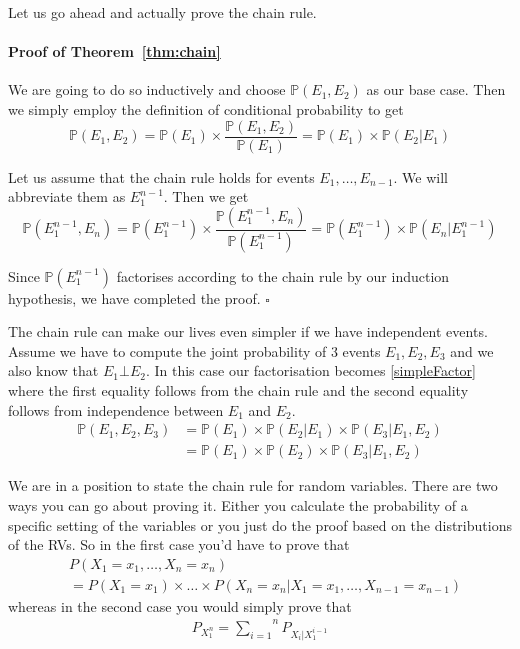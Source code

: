 Let us go ahead and actually prove the chain rule. 
\paragraph{Proof of Theorem~\ref{thm:chain}} We are going to do so inductively and choose $ \mathbb{P}(E_{1}, E_{2}) $ as our
base case. Then we simply employ the definition of conditional probability to get
\begin{equation}
\mathbb{P}(E_{1}, E_{2}) = \mathbb{P}(E_{1}) \times \dfrac{\mathbb{P}(E_{1}, E_{2})}{\mathbb{P}(E_{1})} = \mathbb{P}(E_{1}) \times \mathbb{P}(E_{2}|E_{1})
\end{equation}

Let us assume that the chain rule holds for events $ E_{1}, \ldots, E_{n-1} $. We will abbreviate them as $ E_{1}^{n-1} $. Then we get
\begin{equation}
\mathbb{P}(E_{1}^{n-1}, E_{n}) = \mathbb{P}(E_{1}^{n-1}) \times \dfrac{\mathbb{P}(E_{1}^{n-1}, E_{n})}{\mathbb{P}(E_{1}^{n-1})} 
= \mathbb{P}(E_{1}^{n-1}) \times \mathbb{P}(E_{n}|E_{1}^{n-1})
\end{equation}

Since $ \mathbb{P}(E_{1}^{n-1}) $ factorises according to the chain
rule by our induction hypothesis, we have completed the proof.
$ \square $\bigskip

The chain rule can make our lives even simpler if we have independent events. Assume we have to compute the joint probability of 3 events 
$ E_{1},E_{2},E_{3} $ and we also know that $ E_{1} \bot E_{2} $. In this case our factorisation becomes \ref{simpleFactor} where
the first equality follows from the chain rule and the second equality follows from independence between $ E_{1} $ and $ E_{2} $.
\begin{align} \label{simpleFactor}
\mathbb{P}(E_{1}, E_{2}, E_{3}) &= \mathbb{P}(E_{1}) \times \mathbb{P}(E_{2}|E_{1}) \times \mathbb{P}(E_{3}|E_{1},E_{2}) \\
&= \mathbb{P}(E_{1}) \times \mathbb{P}(E_{2}) \times \mathbb{P}(E_{3}|E_{1},E_{2}) \nonumber
\end{align}

We are in a position to state the chain rule for random variables. There are two ways you can go about proving it. Either you 
calculate the probability of a specific setting of the variables or you just do the proof based on the distributions of the RVs.
So in the first case you'd have to prove that 
\begin{align*}
&P(X_{1} = x_{1}, \ldots, X_{n} = x_{n}) \\
&= P(X_{1} = x_{1}) \times \ldots \times P(X_{n} = x_{n}|X_{1}=x_{1}, \ldots, X_{n-1} = x_{n-1})
\end{align*}
whereas in the second case you would simply prove that
\begin{align*}
P_{X_{1}^{n}} = \overset{n}{\underset{i=1}{\sum}}P_{X_{i}|X_{1}^{i-1}}
\end{align*}

